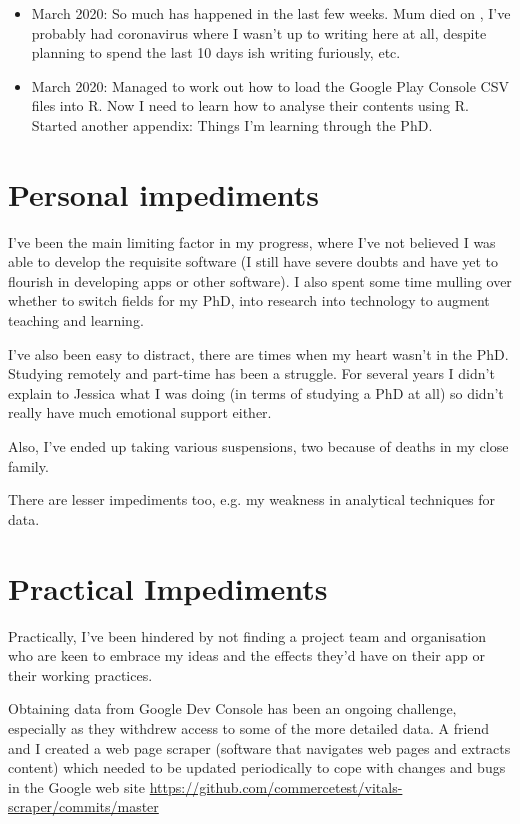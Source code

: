 \begin{itemize}
    \item {} March 2020: So much has happened in the last few weeks. Mum died on , I've probably had coronavirus where I wasn't up to writing here at all, despite planning to spend the last 10 days ish writing furiously, etc.
    \item {} March 2020: Managed to work out how to load the Google Play Console CSV files into R. Now I need to learn how to analyse their contents using R. Started another appendix: Things I'm learning through the PhD. 

\end{itemize}

\section{Personal impediments}
I've been the main limiting factor in my progress, where I've not believed I was able to develop the requisite software (I still have severe doubts and have yet to flourish in developing apps or other software). I also spent some time mulling over whether to switch fields for my PhD, into research into technology to augment teaching and learning. 

I've also been easy to distract, there are times when my heart wasn't in the PhD. Studying remotely and part-time has been a struggle. For several years I didn't explain to Jessica what I was doing (in terms of studying a PhD at all) so didn't really have much emotional support either.

Also, I've ended up taking various suspensions, two because of deaths in my close family.

There are lesser impediments too, e.g. my weakness in analytical techniques for data. 

\section{Practical Impediments}
Practically, I've been hindered by not finding a project team and organisation who are keen to embrace my ideas and the effects they'd have on their app or their working practices.

Obtaining data from Google Dev Console has been an ongoing challenge, especially as they withdrew access to some of the more detailed data. A friend and I created a web page scraper (software that navigates web pages and extracts content) which needed to be updated periodically to cope with changes and bugs in the Google web site \url{https://github.com/commercetest/vitals-scraper/commits/master}

